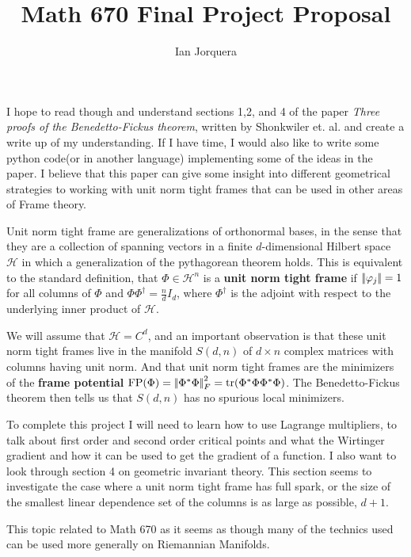 \documentclass{article}
\title{Math 670 Final Project Proposal}
\author{Ian Jorquera}
\begin{document}
\maketitle

I hope to read though and understand sections 1,2, and 4 of the paper \emph{Three proofs of the Benedetto-Fickus theorem}, written by Shonkwiler et. al. and create a write up of my understanding. If I have time, I would also like to write some python code(or in another language) implementing some of the ideas in the paper.
I believe that this paper can give some insight into different geometrical strategies to working with unit norm tight frames that can be used in other areas of Frame theory.

Unit norm tight frame are generalizations of orthonormal bases, in the sense that they are a collection of spanning vectors in a finite $d$-dimensional Hilbert space $\mathcal H$ in which a generalization of the pythagorean theorem holds. This is equivalent to the standard definition, that $\Phi\in \mathcal H^n$ is a \textbf{unit norm tight frame} if $\norm{\phi_j}=1$ for all columns of $\Phi$ and $\Phi\Phi^\dagger= \frac{n}{d}I_d$, where $\Phi^\dagger$ is the adjoint with respect to the underlying inner product of $\mathcal H$.

We will assume that $\mathcal H=C^d$, and an important observation is that these unit norm tight frames live in the manifold $S(d,n)$ of $d\times n$ complex matrices with columns having unit norm. And that unit norm tight frames are the minimizers of the \textbf{frame potential} 
$\text{FP}(\Phi)=\norm{\Phi^*\Phi}_F^2=\tr(\Phi^*\Phi\Phi^*\Phi)$.
The Benedetto-Fickus theorem then tells us that $S(d,n)$ has no spurious local minimizers.

To complete this project I will need to learn how to use Lagrange multipliers, to talk about first order and second order critical points and what the Wirtinger gradient and how it can be used to get the gradient of a function. 
I also want to look through section 4 on geometric invariant theory. This section seems to investigate the case where a unit norm tight frame has full spark, or the size of the smallest linear dependence set of the columns is as large as possible, $d+1$.

This topic related to Math 670 as it seems as though many of the technics used can be used more generally on Riemannian Manifolds.

%
%
\end{document}
